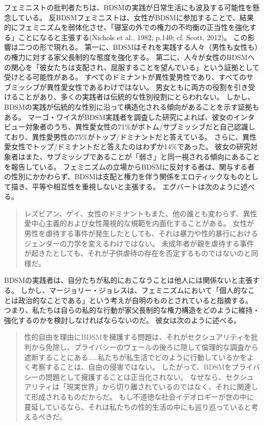 \documentclass[paper=a4,book,openany]{jlreq} \usepackage{mystyle}
\begin{document}
フェミニストの批判者たちは、BDSMの実践が日常生活にも波及する可能性を懸念している。
反BDSMフェミニストは、女性がBDSMに参加することで、結果的にフェミニズムを弱体化させ、「寝室の外での権力の不均衡の正当性を強化する」ことになると主張する(Nichols et al., 1982, p.140; cf. Scott, 2012)\nocite{nichols82:_is_sadom_femin}\nocite{scott12:_think_kink}。
この影響は二つの形で現れる。
第一に、BDSMはそれを実践する人々（男性も女性も）の権力に対する家父長制的な態度を強化する。
第二に、人々が女性のBDSMへの関心を「彼女たちは支配され、屈服することを望んでいる」という証拠として受けとる可能性がある。
すべてのドミナントが異性愛男性であり、すべてのサブミッシブが異性愛女性であるわけではない。
男女ともに両方の役割を引き受けることがあり、多くの実践者は伝統的な性別役割にとらわれない。
しかし、BDSMの実践が伝統的な性別に沿って構造化される傾向があることを示す証拠もある。
マーゴ・ワイスがBDSM実践者を調査した研究によれば、彼女のインタビュー対象者のうち、異性愛女性の71\%がボトム/サブミッシブだと自己認識しており、異性愛男性の75\%がトップ/ドミナントだと答えている\citep[p.262 fn.10]{weiss11:_techn_pleas}。
さらに、異性愛女性でトップ/ドミナントだと答えたのはわずか14\%であった。
彼女の研究対象者はまた、サブミッシブであることが「弱さ」と同一視される傾向にあることを報告している\citep[p.176]{weiss11:_techn_pleas}。
フェミニズムの立場からBDSMに反対する者は、関与する者の性別にかかわらず、BDSMは支配と権力を伴う関係をエロティックなものとして描き、平等や相互性を重視しないと主張する。
エグバートは次のように述べる。

\begin{quote}
  レズビアン、ゲイ、女性のドミナントもまた、他の誰とも変わらず、異性愛中心主義的および女性蔑視的な規範を内面化することがある。
女性が男性を虐待する事件が発生したとしても、それは暴力や性的暴行におけるジェンダーの力学を変えるわけではない。
未成年者が親を虐待する事件が起きたとしても、それが子供虐待の存在を否定するものではないのと同様だ。
\citep{egbert15:_bdsm_faq_frequen_asser_quibb}
\end{quote}

BDSMの実践者は、自分たちが私的におこなうことは他人には関係ないと主張する。
しかし、マージョリー・ジョレスは、フェミニズムにおいて「個人的なことは政治的なことである」という考えが自明のものとされていると指摘する。
つまり、私たちは自らの私的な行動が家父長制的な権力構造をどのように維持・強化するのかを検討しなければならないのだ。
彼女は次のように述べる。

\begin{quote}
  性的自由を理由にBDSMを擁護する問題は、それがセクシュアリティを批判から免除し、プライバシーのヴェールの後ろに隠して倫理的な調査から遮断することにある……私たちが私生活でどのように行動しているかをよく考察することは、自由の侵害ではない。
したがって、BDSMをプライバシーの問題として擁護することは正当化されない。
なぜなら、セクシュアリティは「現実世界」から切り離されているのではなく、それに関連して形成されるものだからだ。
もし不道徳な社会イデオロギーが世の中に蔓延しているなら、それは私たちの性的生活の中にも巡り巡っていると考えるべきだ。
\citep[p.268]{jolles15:_pleas_pain_femin_polit_rough_sex}

\end{quote}
\end{document}
